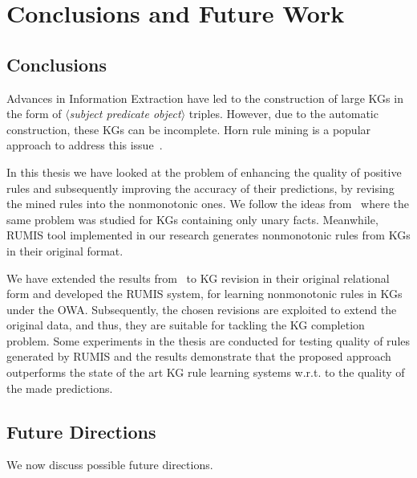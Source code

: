 \chapter{Conclusions and Future Work}
\label{chap:conclusion}

\section{Conclusions}

Advances in Information Extraction have led to the construction of large KGs in the form of \textit{$\langle$subject predicate object$\rangle$} triples. However, due to the automatic construction, these KGs can be incomplete. Horn rule mining is a popular approach to address this issue~\cite{ref10}.

In this thesis we have looked at the problem of enhancing the quality of positive rules and subsequently improving the accuracy of their predictions, by revising the mined rules into the nonmonotonic ones. We follow the ideas from~\cite{ref12} where the same problem was studied for KGs containing only unary facts. Meanwhile, RUMIS tool implemented in our research generates nonmonotonic rules from KGs in their original format.

We have extended the results from~\cite{ref12} to KG revision in their original relational form and developed the RUMIS system, for learning nonmonotonic rules in KGs under the OWA. Subsequently, the chosen revisions are exploited to extend the original data, and thus, they are suitable for tackling the KG completion problem. Some experiments in the thesis are conducted for testing quality of rules generated by RUMIS and the results demonstrate that the proposed approach outperforms the state of the art KG rule learning systems w.r.t. to the quality of the made predictions.

\section{Future Directions}

We now discuss possible future directions.

